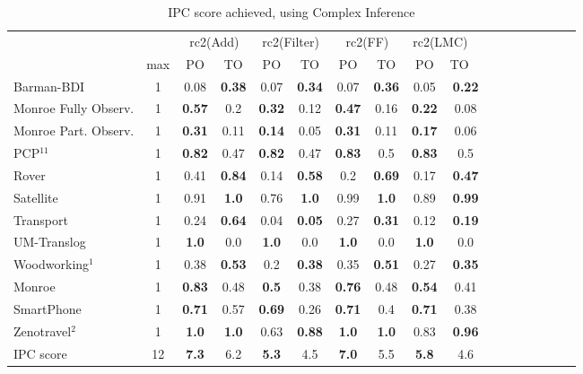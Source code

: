 \documentclass[letterpaper]{article} %
\begin{document}
\begin{table*}[h]
	\centering
	\caption{IPC score achieved, using Complex Inference}
	\scalebox{0.9} {
\begin{tabular}{lccccccccccccccccl} 
	\toprule 
	&& \multicolumn{2}{c}{rc2(Add)} & \multicolumn{2}{c}{rc2(Filter)} & \multicolumn{2}{c}{rc2(FF)} & \multicolumn{2}{c}{rc2(LMC)} \\ 
	\cmidrule(lr){3-4} \cmidrule(lr){5-6} \cmidrule(lr){7-8} \cmidrule(lr){9-10}  
	& max &PO & TO & PO & TO & PO & TO & PO &  TO   \\ 
	\midrule 
	Barman-BDI & 1 & 0.08 & \textbf{0.38} & 0.07 & \textbf{0.34} & 0.07 & \textbf{0.36} & 0.05 &\multicolumn{2}{c}{ \textbf{0.22}  } \\ 
	Monroe Fully Observ. & 1 & \textbf{0.57} & 0.2 & \textbf{0.32} & 0.12 & \textbf{0.47} & 0.16 & \textbf{0.22} &\multicolumn{2}{c}{ 0.08  } \\ 
	Monroe Part. Observ. & 1 & \textbf{0.31} & 0.11 & \textbf{0.14} & 0.05 & \textbf{0.31} & 0.11 & \textbf{0.17} &\multicolumn{2}{c}{ 0.06  } \\ 
	PCP$^{11}$ & 1 & \textbf{0.82} & 0.47 & \textbf{0.82} & 0.47 & \textbf{0.83} & 0.5 & \textbf{0.83} &\multicolumn{2}{c}{ 0.5  } \\ 
	Rover & 1 & 0.41 & \textbf{0.84} & 0.14 & \textbf{0.58} & 0.2 & \textbf{0.69} & 0.17 &\multicolumn{2}{c}{ \textbf{0.47}  } \\ 
	Satellite & 1 & 0.91 & \textbf{1.0} & 0.76 & \textbf{1.0} & 0.99 & \textbf{1.0} & 0.89 &\multicolumn{2}{c}{ \textbf{0.99}  } \\ 
	Transport & 1 & 0.24 & \textbf{0.64} & 0.04 & \textbf{0.05} & 0.27 & \textbf{0.31} & 0.12 &\multicolumn{2}{c}{ \textbf{0.19}  } \\ 
	UM-Translog & 1 & \textbf{1.0} & 0.0 & \textbf{1.0} & 0.0 & \textbf{1.0} & 0.0 & \textbf{1.0} &\multicolumn{2}{c}{ 0.0  } \\ 
	Woodworking$^{1}$ & 1 & 0.38 & \textbf{0.53} & 0.2 & \textbf{0.38} & 0.35 & \textbf{0.51} & 0.27 &\multicolumn{2}{c}{ \textbf{0.35}  } \\ 
	\midrule 
	Monroe & 1 & \textbf{0.83} & 0.48 & \textbf{0.5} & 0.38 & \textbf{0.76} & 0.48 & \textbf{0.54} &\multicolumn{2}{c}{ 0.41  } \\ 
	SmartPhone & 1 & \textbf{0.71} & 0.57 & \textbf{0.69} & 0.26 & \textbf{0.71} & 0.4 & \textbf{0.71} &\multicolumn{2}{c}{ 0.38  } \\ 
	Zenotravel$^{2}$ & 1 & \textbf{1.0} & \textbf{1.0} & 0.63 & \textbf{0.88} & \textbf{1.0} & \textbf{1.0} & 0.83 &\multicolumn{2}{c}{ \textbf{0.96}  } \\ 
	\midrule 
	IPC score & 12 & \textbf{7.3} & 6.2 & \textbf{5.3} & 4.5 & \textbf{7.0} & 5.5 & \textbf{5.8} &\multicolumn{2}{c}{ 4.6  } \\ 
	\bottomrule 
\end{tabular} 	
	}
\end{table*}
\end{document}

